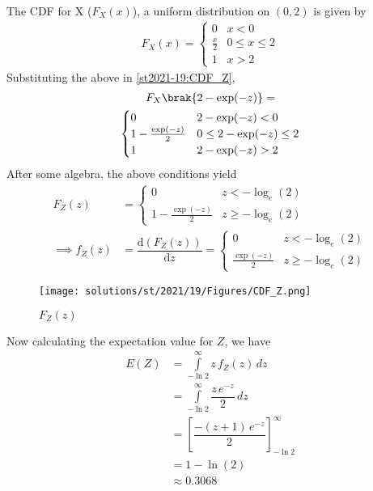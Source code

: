 The CDF for X ($F_X(x)$), a uniform distribution on $(0,2)$ is given by
\begin{align}
F_X(x) = 
\begin{cases}
0 &  x < 0 \\
\frac{x}{2} & 0 \leq x \leq 2 \\
1 & x > 2
\end{cases}
\end{align}
%
Substituting the above in \eqref{st2021-19:CDF_Z},
%
\begin{multline}
F_X\brak{2- \exp(-z)} =
\\
\begin{cases}
0 &  2- \exp(-z) < 0 \\
1- \frac{\exp(-z)}{2} & 0 \leq 2- \exp(-z) \leq 2 \\
1 & 2- \exp(-z) > 2
\end{cases}
\end{multline}
After some algebra, the above conditions yield
\begin{align}
F_Z(z) &= 
\begin{cases}
0 & z < -\log_e (2) \\
1- \frac{\exp(-z)}{2} & z \geq -\log_e (2)
\end{cases}
\label{st2021-19:CDF_Z_Final}\\
\implies f_Z(z)&=\dfrac{\text{d}(F_Z(z))}{\text{d}z}   
=\begin{cases}
0 & z < -\log_e (2) \\
\frac{\exp(-z)}{2} & z \geq -\log_e (2)
\end{cases}
\label{st2021-19:PDF_Z_Final}
\end{align}
\begin{figure}[!ht]
    \centering
      \texttt{[image: solutions/st/2021/19/Figures/CDF\_Z.png]}
     \caption{$F_Z(z)$}
\end{figure}
Now calculating the expectation value for $Z$, we have
\begin{align}
    E(Z)&=\int\limits_{-\ln{2}}^{\infty}z\,f_Z(z)\,dz\\
    &=\int\limits_{-\ln{2}}^{\infty}\dfrac{z\,e^{-z}}{2}\,dz\\
    &=\left[ \dfrac{-(z+1)\,e^{-z}}{2} \right]_{-\ln{2}}^\infty\\
    &=1-\ln{(2)}\\
    &\approx0.3068
\end{align}

